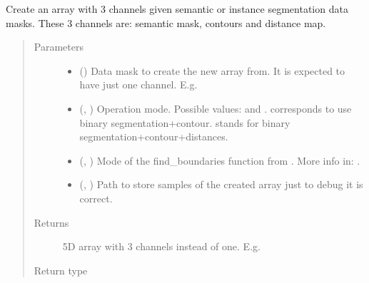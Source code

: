 \documentclass[letterpaper,10pt,english]{sphinxmanual}
\begin{document}

\begin{fulllineitems}
\label{\detokenize{utils/util:utils.util.labels_into_bcd}}
Create an array with 3 channels given semantic or instance segmentation data masks. These 3 channels are:
semantic mask, contours and distance map.
\begin{quote}\begin{description}
\item[{Parameters}] \leavevmode\begin{itemize}
\item {} 
 () \textendash{} Data mask to create the new array from. It is expected to have just one channel. E.g. 

\item {} 
 (, ) \textendash{} Operation mode. Possible values:  and .   corresponds to use binary segmentation+contour.
 stands for binary segmentation+contour+distances.

\item {} 
 (, ) \textendash{} Mode of the find\_boundaries function from . More info in:
.

\item {} 
 (, ) \textendash{} Path to store samples of the created array just to debug it is correct.

\end{itemize}

\item[{Returns}] \leavevmode
{} \textendash{} 5D array with 3 channels instead of one. E.g. 

\item[{Return type}] \leavevmode
{}

\end{description}\end{quote}

\end{fulllineitems}
\end{document}
